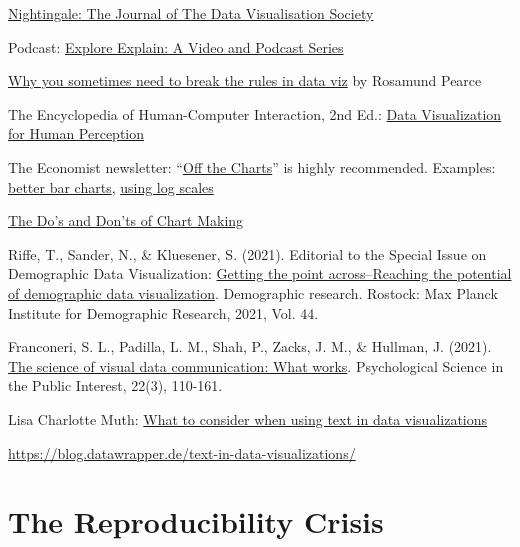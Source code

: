 \documentclass[
]{book}
\begin{document}
\href{https://medium.com/nightingale}{Nightingale: The Journal of The Data Visualisation Society}

Podcast: \href{https://www.visualisingdata.com/podcast/}{Explore Explain: A Video and Podcast Series}

\href{https://medium.economist.com/why-you-sometimes-need-to-break-the-rules-in-data-viz-4d8ece284919}{Why you sometimes need to break the rules in data viz} by Rosamund Pearce

The Encyclopedia of Human-Computer Interaction, 2nd Ed.: \href{https://www.interaction-design.org/literature/book/the-encyclopedia-of-human-computer-interaction-2nd-ed/data-visualization-for-human-perception}{Data Visualization for Human Perception}

The Economist newsletter: ``\href{https://www.economist.com/offthecharts/}{Off the Charts}'' is highly recommended. Examples: \href{https://view.e.economist.com/?qs=56104efe1f008c7741aaecad26fac5ac478021656b5a9180944c48b674116491a6f66c9f3634ba531584569cbf53c8668ce8496cc20515719fb62b40048ac22dd528432bf4149fd74086ba8db6b1b99c}{better bar charts}, \href{https://view.e.economist.com/?qs=d55c97a1de83b95ad1aa9d756a88fafed0667fd13b0f03f87873b0da100014d793b5daf177867d16839f007b7c64b8febf2834c6517faf9f686782c48696e6b52d21ec363f03f3efb7bf039c6351e781}{using log scales}

\href{https://towardsdatascience.com/the-dos-and-don-ts-of-chart-making-13c629456027}{The Do's and Don'ts of Chart Making}

Riffe, T., Sander, N., \& Kluesener, S. (2021). Editorial to the Special Issue on Demographic Data Visualization: \href{https://www.demographic-research.org/volumes/vol44/36/}{Getting the point across--Reaching the potential of demographic data visualization}. Demographic research. Rostock: Max Planck Institute for Demographic Research, 2021, Vol. 44.

Franconeri, S. L., Padilla, L. M., Shah, P., Zacks, J. M., \& Hullman, J. (2021). \href{https://journals.sagepub.com/doi/pdf/10.1177/15291006211051956}{The science of visual data communication: What works}. Psychological Science in the Public Interest, 22(3), 110-161.

Lisa Charlotte Muth: \href{https://blog.datawrapper.de/text-in-data-visualizations/}{What to consider when using text in data visualizations}

\url{https://blog.datawrapper.de/text-in-data-visualizations/}

\hypertarget{the-reproducibility-crisis}{%
\section{The Reproducibility Crisis}\label{the-reproducibility-crisis}}
\end{document}
